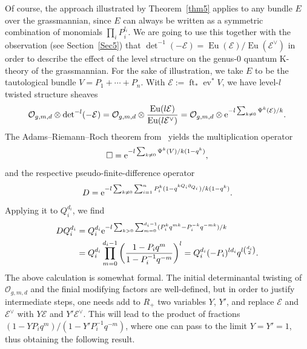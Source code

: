 \documentclass[pdftex]{sigma}
\numberwithin{equation}{section}
\def\E{\mathcal E}
\def\O{\mathcal O}
\def\det{\operatorname{det}}
\def\p{\partial}
\def\ev{\operatorname{ev}}
\def\ft{\operatorname{ft}}
\def\Eu{\operatorname{Eu}}
\def\square{\Box}
\begin{document}
Of course, the approach illustrated by Theorem~\ref{thm5} applies to any bundle $E$ over the grassmannian, since $E$ can always be written as a symmetric combination of monomials $\prod_i P_i^{l_i}$. We are going to use this together with the observation (see Section~\ref{Sec5}) that $\det^{-1}(-\E) =\Eu (\E)/\Eu (\E^{\vee})$ in order to describe the effect of the level structure on the genus-0 quantum K-theory of the grassmannian. For the sake of illustration, we take $E$ to be the tautological bundle $V=P_1+\cdots+P_n$. With $\E:=\ft_*\ev^*V$, we have level-$l$ twisted structure sheaves
\[
\O_{g,m,d}\otimes \det^{-l}(-\E) = \O_{g,m,d}\otimes \frac{\Eu(l \E)}{\Eu(l \E^{\vee})} = \O_{g,m,d}\otimes {\rm e}^{-l \sum_{k\neq 0} \Psi^k(\E)/k}.
\]
The Adams--Riemann--Roch theorem from~\cite{Givental:perm11} yields the multiplication operator
\[
\square = {\rm e}^{ -l \sum_{k\neq 0}\Psi^k(V)/k(1-q^k)},
\]
and the respective pseudo-finite-difference operator
\[
D={\rm e}^{ -l \sum_{k\neq 0}\sum_{i=1}^n P^k_i(1-q^{kQ_i\p_{Q_i}})/k(1-q^k)}.
\]
Applying it to $Q_i^{d_i}$, we find
\begin{align*}
D Q_i^{d_i} &= Q_i^{d_i}{\rm e}^{ -l\sum_{k>0}\sum_{m=0}^{d_i-1}(P_i^kq^{mk}-P_i^{-k}q^{-mk})/k}\\
 & = Q_i^{d_i}\prod_{m=0}^{d_i-1}\left(\frac{1-P_iq^m}{1-P_i^{-1}q^{-m}}\right)^l = Q_i^{d_i}(-P_i)^{ld_i}q^{l\binom{d_i}{2}}.
\end{align*}
The above calculation is somewhat formal. The initial determinantal twisting of $\O_{g,m,d}$ and the finial modifying factors are well-defined, but in order to justify intermediate steps, one needs add to $R_{+}$ two variables $Y$, $Y'$, and replace $\E$ and $\E^{\vee}$ with $Y\E$ and $Y'\E^{\vee}$. This will lead to the product of fractions $(1-YP_iq^m)/(1-Y'P_i^{-1}q^{-m})$, where one can pass to the limit $Y=Y'=1$, thus obtaining the following result.
\end{document}
